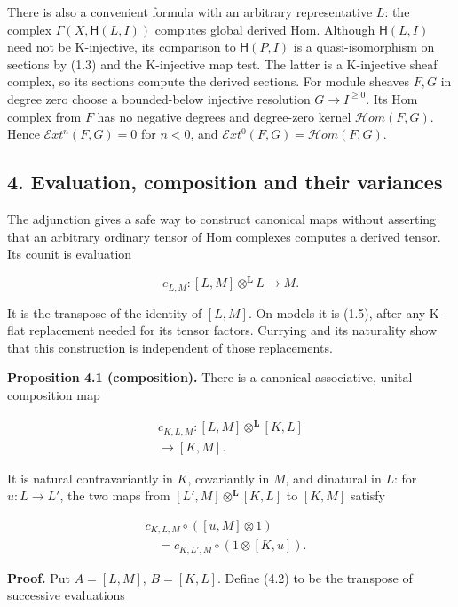 \documentclass[
  english,
  11pt,
  a4paper,
]{article}
\begin{document}
There is also a convenient formula with an arbitrary representative
\(L\): the complex \(\Gamma(X,\mathsf H(L,I))\) computes global derived
Hom. Although \(\mathsf H(L,I)\) need not be K-injective, its comparison
to \(\mathsf H(P,I)\) is a quasi-isomorphism on sections by (1.3) and
the K-injective map test. The latter is a K-injective sheaf complex, so
its sections compute the derived sections. For module sheaves \(F,G\) in
degree zero choose a bounded-below injective resolution
\(G\to I^{\geq0}\). Its Hom complex from \(F\) has no negative degrees
and degree-zero kernel \(\mathcal Hom(F,G)\). Hence
\(\mathcal Ext^n(F,G)=0\) for \(n<0\), and
\(\mathcal Ext^0(F,G)=\mathcal Hom(F,G)\).

\subsection{4. Evaluation, composition and their
variances}\label{internal-derived-hom-and-ext-sheaves--4-evaluation-composition-and-their-variances}

The adjunction gives a safe way to construct canonical maps without
asserting that an arbitrary ordinary tensor of Hom complexes computes a
derived tensor. Its counit is evaluation

\[e_{L,M}:[L,M]\otimes^{\mathbf L}L\longrightarrow M.
\tag{4.1}\]

It is the transpose of the identity of \([L,M]\). On models it is (1.5),
after any K-flat replacement needed for its tensor factors. Currying and
its naturality show that this construction is independent of those
replacements.

\textbf{Proposition 4.1 (composition).} There is a canonical
associative, unital composition map

\[\begin{gathered}
c_{K,L,M}:[L,M]\otimes^{\mathbf L}[K,L]\\
\longrightarrow[K,M].
\end{gathered}
\tag{4.2}\]

It is natural contravariantly in \(K\), covariantly in \(M\), and
dinatural in \(L\): for \(u:L\to L'\), the two maps from
\([L',M]\otimes^{\mathbf L}[K,L]\) to \([K,M]\) satisfy

\[\begin{aligned}
c_{K,L,M}\circ([u,M]\otimes1)&\\
\quad=c_{K,L',M}\circ(1\otimes[K,u]).&
\end{aligned}
\tag{4.3}\]

\textbf{Proof.} Put \(A=[L,M]\), \(B=[K,L]\). Define (4.2) to be the
transpose of successive evaluations
\end{document}
